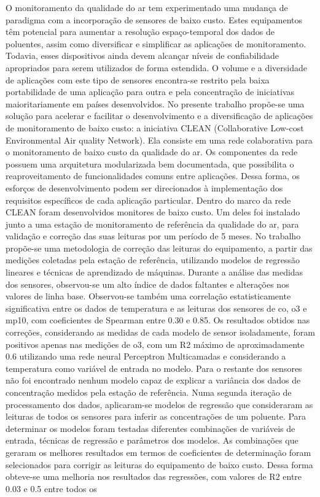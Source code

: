 \setlength{\absparsep}{18pt} %
\begin{resumo}
	\SingleSpacing
	O monitoramento da qualidade do ar tem experimentado uma mudança de paradigma com a incorporação de sensores de baixo custo. Estes equipamentos têm potencial para aumentar a resolução espaço-temporal dos dados de poluentes, assim como diversificar e simplificar as aplicações de monitoramento. Todavia, esses dispositivos ainda devem alcançar níveis de confiabilidade apropriados para serem utilizados de forma estendida. O volume e a diversidade de aplicações com este tipo de sensores encontra-se restrito pela baixa portabilidade de uma aplicação para outra e pela concentração de iniciativas maioritariamente em países desenvolvidos. No presente trabalho propõe-se uma solução para acelerar e facilitar o desenvolvimento e a diversificação de aplicações de monitoramento de baixo custo: a iniciativa CLEAN (Collaborative Low-cost Environmental Air quality Network). Ela consiste em uma rede colaborativa para o monitoramento de baixo custo da qualidade do ar. Os componentes da rede possuem uma arquitetura modularizada bem documentada, que possibilita o reaproveitamento de funcionalidades comuns entre aplicações. Dessa forma, os esforços de desenvolvimento podem ser direcionados à implementação dos requisitos específicos de cada aplicação particular. Dentro do marco da rede CLEAN foram desenvolvidos monitores de baixo custo. Um deles foi instalado junto a uma estação de monitoramento de referência da qualidade do ar, para validação e correção das suas leituras por um período de 5 meses. No trabalho propõe-se uma metodologia de correção das leituras do equipamento, a partir das medições coletadas pela estação de referência, utilizando modelos de regressão lineares e técnicas de aprendizado de máquinas. Durante a análise das medidas dos sensores, observou-se um alto índice de dados faltantes e alterações nos valores de linha base. Observou-se também uma correlação estatisticamente significativa entre os dados de temperatura e as leituras dos sensores de \acrshort{co}, \acrshort{o3} e \acrshort{mp10}, com coeficientes de Spearman entre 0.30 e 0.85. Os resultados obtidos nas correções, considerando as medidas de cada modelo de sensor isoladamente, foram positivos apenas nas medições de \acrshort{o3}, com um R2 máximo de aproximadamente 0.6 utilizando uma rede neural Perceptron Multicamadas e considerando a temperatura como variável de entrada no modelo. Para o restante dos sensores não foi encontrado nenhum modelo capaz de explicar a variância dos dados de concentração medidos pela estação de referência. Numa segunda iteração de processamento dos dados, aplicaram-se modelos de regressão que consideraram as leituras de todos os sensores para inferir as concentrações de um poluente. Para determinar os modelos foram testadas diferentes combinações de variáveis de entrada, técnicas de regressão e parâmetros dos modelos. As combinações que geraram os melhores resultados em termos de coeficientes de determinação foram selecionados para corrigir as leituras do equipamento de baixo custo. Dessa forma obteve-se uma melhoria nos resultados das regressões, com valores de R2 entre 0.03 e 0.5 entre todos os 
\end{resumo}
